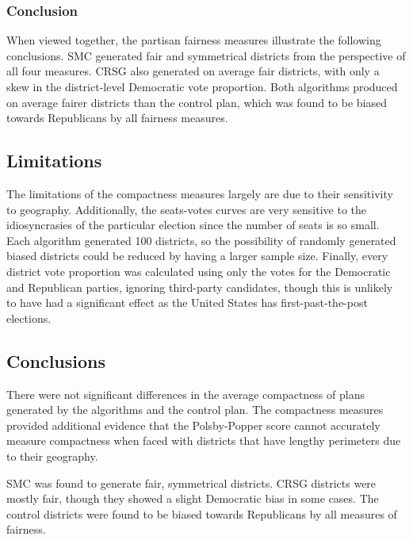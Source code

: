 \subsubsection{Conclusion}

When viewed together, the partisan fairness measures illustrate the following conclusions. SMC generated fair and symmetrical districts from the perspective of all four measures. CRSG also generated on average fair districts, with only a skew in the district-level Democratic vote proportion. Both algorithms produced on average fairer districts than the control plan, which was found to be biased towards Republicans by all fairness measures. 

\subsection{Limitations}

The limitations of the compactness measures largely are due to their sensitivity to geography. Additionally, the seats-votes curves are very sensitive to the idiosyncrasies of the particular election since the number of seats is so small. Each algorithm generated 100 districts, so the possibility of randomly generated biased districts could be reduced by having a larger sample size. Finally, every district vote proportion was calculated using only the votes for the Democratic and Republican parties, ignoring third-party candidates, though this is unlikely to have had a significant effect as the United States has first-past-the-post elections. 

\subsection{Conclusions}

There were not significant differences in the average compactness of plans generated by the algorithms and the control plan. The compactness measures provided additional evidence that the Polsby-Popper score cannot accurately measure compactness when faced with districts that have lengthy perimeters due to their geography. 

SMC was found to generate fair, symmetrical districts. CRSG districts were mostly fair, though they showed a slight Democratic bias in some cases. The control districts were found to be biased towards Republicans by all measures of fairness. 